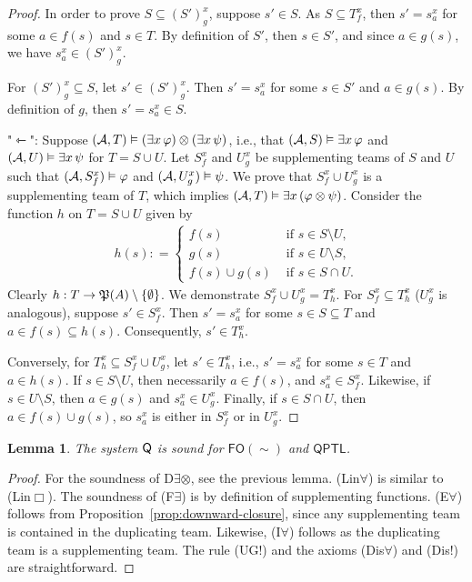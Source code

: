 \documentclass[a4paper,english,fleqn,11pt,final]{scrartcl}
\makeatletter
\newcommand{\ie}{i.e.\@\xspace}
\newcommand{\pow}[1]{{\protect\ensuremath{\mathord{\mathfrak{P}(\nobreak#1\nobreak)}}}}
\newcommand{\negg}{{\sim}}
\newcommand{\logic}[1]{\ensuremath{\mathsf{#1}}\xspace}
\newcommand{\FO}{\logic{FO}}
\newcommand{\QPTL}{\logic{QPTL}}
\newcommand{\calA}{\protect\ensuremath{\mathcal{A}}}
\newcommand{\sfQ}{\protect\ensuremath{\mathsf{Q}}}
\providecommand{\dfn}{\mathrel{\mathop:}=}
\newcommand{\tens}{\otimes}
\newcommand{\Deriv}[1]{{\normalfont\textsf{#1}}}
\DeclareMathOperator{\shriek}{!}
\theoremstyle{plain}
\newtheorem{lemma}[theorem]{Lemma}
\theoremstyle{definition}
\makeatother
\begin{document}
\begin{proof}
In order to prove $S \subseteq (S')^x_g$, suppose $s' \in S$.
As $S \subseteq T^x_f$, then $s' = s^x_a$ for some $a \in f(s)$ and $s \in T$.
By definition of $S'$, then $s \in S'$, and since $a \in g(s)$, we have $s^x_a \in (S')^x_g$.

For $(S')^x_g \subseteq S$, let $s' \in (S')^x_g$.
Then $s' = s^x_a$ for some $s \in S'$ and $a \in g(s)$.
By definition of $g$, then $s' = s^x_a \in S$.

\medskip

"$\leftarrowtriangle$":
Suppose $(\calA,T) \vDash (\exists x\, \varphi)\tens (\exists x\, \psi)$, \ie, that $(\calA, S) \vDash \exists x \,\varphi$ and $(\calA, U)\vDash \exists x\, \psi$ for $T = S \cup U$.
Let $S^x_f$ and $U^x_g$ be supplementing teams of $S$ and $U$ such that $(\calA, S^x_f)\vDash \varphi$ and $(\calA, U^x_g)\vDash \psi$.
We prove that $S^x_f \cup U^x_g$ is a supplementing team of $T$, which implies $(\calA, T) \vDash \exists x \, (\varphi \tens \psi)$.
Consider the function $h$ on $T = S \cup U$ given by
\begin{align*}
h(s) \dfn \begin{cases}f(s) &\text{ if }s \in S \setminus U\text{,}\\
g(s) &\text{ if }s \in U \setminus S\text{,}\\
f(s) \cup g(s)& \text{ if }s \in S \cap U\text{.}
\end{cases}
\end{align*}
Clearly $h : T \to \pow{A} \setminus \{\emptyset\}$.
We demonstrate $S^x_f \cup U^x_g = T^x_h$.
For $S^x_f \subseteq T^x_h$ ($U^x_g$ is analogous), suppose $s' \in S^x_f$.
Then $s' = s^x_a$ for some $s \in S \subseteq T$ and $a \in f(s) \subseteq h(s)$.
Consequently, $s' \in T^x_h$.

Conversely, for $T^x_h \subseteq S^x_f \cup U^x_g$, let $s' \in T^x_h$, \ie, $s' = s^x_a$ for some $s \in T$ and $a \in h(s)$.
If $s \in S \setminus U$, then necessarily $a \in f(s)$, and $s^x_a \in S^x_f$.
Likewise, if $s \in U \setminus S$, then $a \in g(s)$ and $s^x_a \in U^x_g$.
Finally, if $s \in S \cap U$, then $a \in f(s)\cup g(s)$, so $s^x_a$ is either in $S^x_f$ or in $U^x_g$.
\end{proof}

\begin{lemma}
The system $\sfQ$ is sound for $\FO(\negg)$ and $\QPTL$.
\end{lemma}
\begin{proof}
For the soundness of \Deriv{D$\exists\tens$}, see the previous lemma.
\Deriv{(Lin$\forall$)} is similar to \Deriv{(Lin$\Box$)}.
The soundness of \Deriv{(F$\exists$)} is by definition of supplementing functions.
\Deriv{(E$\forall$)} follows from Proposition~\ref{prop:downward-closure}, since any supplementing team is contained in the duplicating team.
Likewise, \Deriv{(I$\forall$)} follows as the duplicating team is a supplementing team.
The rule \Deriv{(UG$\shriek$)} and the axioms \Deriv{(Dis$\forall$)} and \Deriv{(Dis$\shriek$)} are straightforward.
\end{proof}
\end{document}
